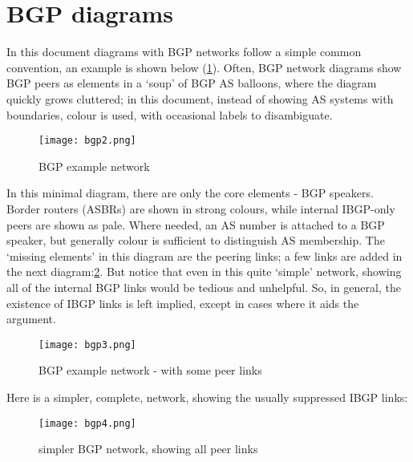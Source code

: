 
\section*{BGP diagrams}

In this document diagrams with BGP networks follow a simple common convention, an example is shown below (\ref{fig:diag1}).
Often, BGP network diagrams show BGP peers as elements in a `soup' of BGP AS balloons, where the diagram quickly grows cluttered; in this document, instead of showing AS systems with boundaries, colour is used, with occasional labels to disambiguate.

\begin{figure}[H]
    \centering
    \texttt{[image: bgp2.png]} %
    \caption{BGP example network}
    \label{fig:diag1}
\end{figure}

In this minimal diagram, there are only the core elements - BGP speakers. Border routers (ASBRs) are shown in strong colours, while internal IBGP-only peers are shown as pale.  Where needed, an AS number is attached to a BGP speaker, but generally colour is sufficient to distinguish AS membership.  The `missing elements' in this diagram are the peering links; a few links are added in the next diagram:\ref{fig:diag2}.  But notice that even in this quite `simple' network, showing all of the internal BGP links would be tedious and unhelpful.  So, in general, the existence of IBGP links is left implied, except in cases where it aids the argument.

\begin{figure}[H]
    \centering
    \texttt{[image: bgp3.png]}
    \caption{BGP example network - with some peer links}
    \label{fig:diag2}
\end{figure}

Here is a simpler, complete, network, showing the usually suppressed IBGP links:
\begin{figure}[H]
    \centering
    \texttt{[image: bgp4.png]} %
    \caption{simpler BGP network, showing all peer links}
    \label{fig:diag3}
\end{figure}


